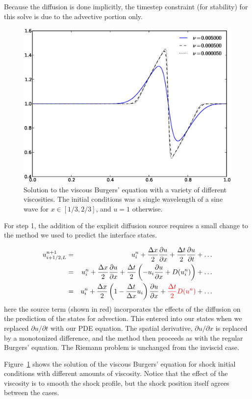 Because the diffusion is done implicitly, the timestep constraint (for
stability) for this solve is due to the advective portion only.

\begin{figure}[t]
\centering
\includegraphics[width=5in]{burgervisc}
\caption[Viscous Burgers' equation solution]
  {\label{fig:viscburger} Solution to the viscous Burgers' equation
  with a variety of different viscosities.  The initial conditions was
  a single wavelength of a sine wave for $x \in [1/3,2/3]$, and $u = 1$
  otherwise. \\
  }
\end{figure}

For step 1, the addition of the explicit diffusion source requires
a small change to the method we used to predict the interface states.

\begin{eqnarray}
u^{n+1}_{i+1/2,L} &=& u^n_i + \frac{\Delta x}{2} \frac{\partial u}{\partial x}
                        + \frac{\Delta t}{2} \frac{\partial u}{\partial t} + \ldots \\
                &=& u^n_i + \frac{\Delta x}{2} \frac{\partial u}{\partial x}
                        + \frac{\Delta t}{2} \left (-u_i \frac{\partial u}{\partial x} + D(u^n_i) \right ) + \ldots \\
                &=& u^n_i + \frac{\Delta x}{2} \left ( 1 - \frac{\Delta t}{\Delta x}u_i \right ) \frac{\partial u}{\partial x} + {\color{red} \frac{\Delta t}{2} D(u^n) } + \ldots
\end{eqnarray}
here the source term (shown in red) incorporates the effects of the
diffusion on the prediction of the states for advection.  This entered
into our states when we replaced $\partial u/\partial t$ with our PDE
equation.  The spatial derivative, $\partial u/\partial x$ is replaced
by a monotonized difference, and the method then proceeds as with the
regular Burgers' equation.  The Riemann problem is unchanged from the
inviscid case.

Figure~\ref{fig:viscburger} shows the solution of the viscous Burgers'
equation for shock initial conditions with different amounts of
viscosity.  Notice that the effect of the viscosity is to smooth the
shock profile, but the shock position itself agrees between the cases.



